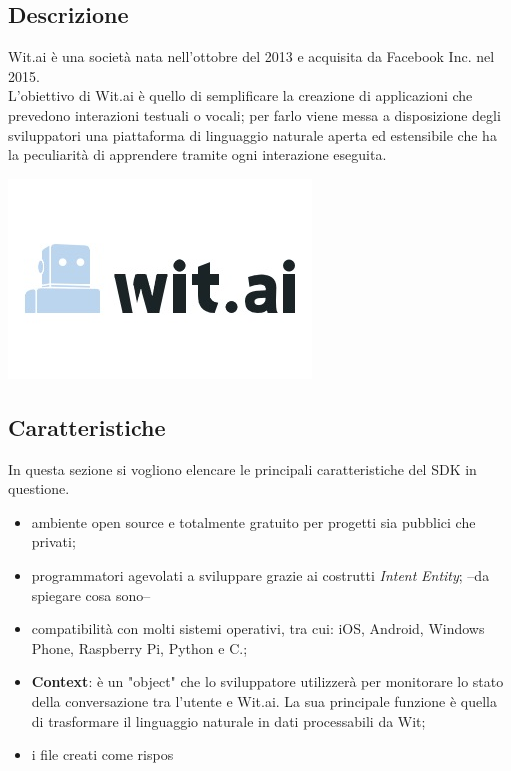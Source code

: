 \documentclass[a4paper,titlepage]{article}
\begin{document}
	\subsection{Descrizione}
		\begin{minipage}{0.7\textwidth}\raggedright
			Wit.ai è una società nata nell'ottobre del 2013 e acquisita da Facebook Inc. nel 2015. \\
			L'obiettivo di Wit.ai è quello di semplificare la creazione di applicazioni che prevedono interazioni testuali o vocali; per farlo viene messa a disposizione degli sviluppatori una piattaforma di linguaggio naturale aperta ed estensibile che ha la peculiarità di apprendere tramite ogni interazione eseguita.
		\end{minipage}
		\hfill
		\noindent\begin{minipage}{0.15\textwidth}
		\includegraphics[scale=0.6]{images/witai.jpg}
		\end{minipage}
		\subsection{Caratteristiche}
In questa sezione si vogliono elencare le principali caratteristiche del SDK in questione.
\begin{itemize}
	\item ambiente open source e totalmente gratuito per progetti sia pubblici che privati;
	\item programmatori agevolati a sviluppare grazie ai costrutti \textit{Intent} \textit{Entity}; --da spiegare cosa sono--
	\item compatibilità con molti sistemi operativi, tra cui: iOS, Android, Windows Phone, Raspberry Pi, Python e C.;
	\item \textbf{Context}: è un "object" che lo sviluppatore utilizzerà per monitorare lo stato della conversazione tra l'utente e Wit.ai. La sua principale funzione è quella di trasformare il linguaggio naturale in dati processabili da Wit;
	\item i file creati come rispos
	
\end{itemize}	
		
\end{document}

